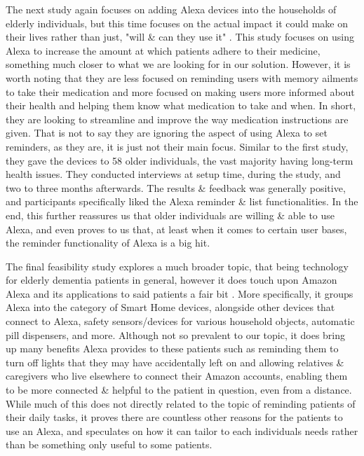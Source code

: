 \documentclass[11pt, oneside]{article}
\begin{document}
The next study again focuses on adding Alexa devices into the households of elderly individuals, but this time focuses on the actual impact it could make on their lives rather than just, "will \& can they use it" \cite{b2}. 
This study focuses on using Alexa to increase the amount at which patients adhere to their medicine, something much closer to what we are looking for in our solution. 
However, it is worth noting that they are less focused on reminding users with memory ailments to take their medication and more focused on making users more informed about their health and helping them know what medication to take and when. 
In short, they are looking to streamline and improve the way medication instructions are given. 
That is not to say they are ignoring the aspect of using Alexa to set reminders, as they are, it is just not their main focus. 
Similar to the first study, they gave the devices to 58 older individuals, the vast majority having long-term health issues. 
They conducted interviews at setup time, during the study, and two to three months afterwards. 
The results \& feedback was generally positive, and participants specifically liked the Alexa reminder \& list functionalities. 
In the end, this further reassures us that older individuals are willing \& able to use Alexa, and even proves to us that, at least when it comes to certain user bases, the reminder functionality of Alexa is a big hit. 

The final feasibility study explores a much broader topic, that being technology for elderly dementia patients in general, however it does touch upon Amazon Alexa and its applications to said patients a fair bit \cite{b6}. 
More specifically, it groups Alexa into the category of Smart Home devices, alongside other devices that connect to Alexa, safety sensors/devices for various household objects, automatic pill dispensers, and more. 
Although not so prevalent to our topic, it does bring up many benefits Alexa provides to these patients such as reminding them to turn off lights that they may have accidentally left on and allowing relatives \& caregivers who live elsewhere to connect their Amazon accounts, enabling them to be more connected \& helpful to the patient in question, even from a distance. 
While much of this does not directly related to the topic of reminding patients of their daily tasks, it proves there are countless other reasons for the patients to use an Alexa, and speculates on how it can tailor to each individuals needs rather than be something only useful to some patients. 
\end{document}
